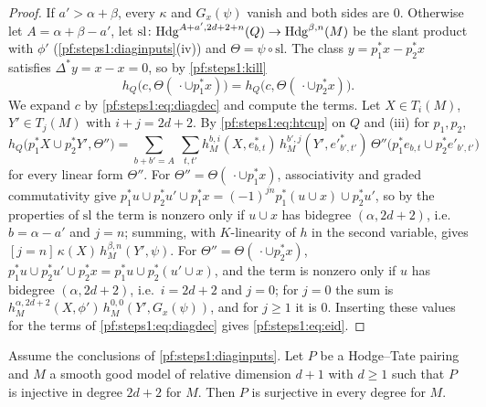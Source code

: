 \begin{proof}
If $a'>\alpha+\beta$, every $\kappa$ and $G_x(\psi)$ vanish and both sides are $0$. Otherwise let $A=\alpha+\beta-a'$, let
$\mathrm{sl}\colon\mathrm{Hdg}^{A+a',2d+2+n}(Q)\to\mathrm{Hdg}^{\beta,n}(M)$ be the slant product with $\phi'$
(\cref{pf:steps1:diaginputs}(iv)) and $\Theta=\psi\circ\mathrm{sl}$. The class $y=p_1^*x-p_2^*x$ satisfies
$\Delta^*y=x-x=0$, so by \cref{pf:steps1:kill}
\[
 h_Q\bigl(c,\Theta(\,\cdot\cup p_1^*x)\bigr)=h_Q\bigl(c,\Theta(\,\cdot\cup p_2^*x)\bigr).
\]
We expand $c$ by \eqref{pf:steps1:eq:diagdec} and compute the terms. Let $X\in T_i(M)$, $Y'\in T_j(M)$ with $i+j=2d+2$. By
\eqref{pf:steps1:eq:htcup} on $Q$ and (iii) for $p_1,p_2$,
\[
 h_Q\bigl(p_1^*X\cup p_2^*Y',\Theta''\bigr)=\sum_{b+b'=A}\ \sum_{t,t'}h_M^{b,i}(X,e^*_{b,t})\,h_M^{b',j}(Y',e'^*_{b',t'})\,
 \Theta''\bigl(p_1^*e_{b,t}\cup p_2^*e'_{b',t'}\bigr)
\]
for every linear form $\Theta''$. For $\Theta''=\Theta(\,\cdot\cup p_1^*x)$, associativity and graded commutativity give
$p_1^*u\cup p_2^*u'\cup p_1^*x=(-1)^{jn}p_1^*(u\cup x)\cup p_2^*u'$, so by the properties of $\mathrm{sl}$ the term is nonzero only
if $u\cup x$ has bidegree $(\alpha,2d+2)$, i.e.\ $b=\alpha-a'$ and $j=n$; summing, with $K$-linearity of $h$ in the second
variable, gives $[j=n]\,\kappa(X)\,h_M^{\beta,n}(Y',\psi)$. For $\Theta''=\Theta(\,\cdot\cup p_2^*x)$, $p_1^*u\cup p_2^*u'\cup
p_2^*x=p_1^*u\cup p_2^*(u'\cup x)$, and the term is nonzero only if $u$ has bidegree $(\alpha,2d+2)$, i.e.\ $i=2d+2$ and $j=0$;
for $j=0$ the sum is $h_M^{\alpha,2d+2}(X,\phi')\,h_M^{0,0}(Y',G_x(\psi))$, and for $j\ge1$ it is $0$. Inserting these values for
the terms of \eqref{pf:steps1:eq:diagdec} gives \eqref{pf:steps1:eq:eid}.
\end{proof}

\begin{proposition}\label{pf:steps1:onto}
Assume the conclusions of \cref{pf:steps1:diaginputs}. Let $P$ be a Hodge--Tate pairing and $M$ a smooth good model of relative
dimension $d+1$ with $d\ge1$ such that $P$ is injective in degree $2d+2$ for $M$. Then $P$ is surjective in every degree for $M$.
\end{proposition}

